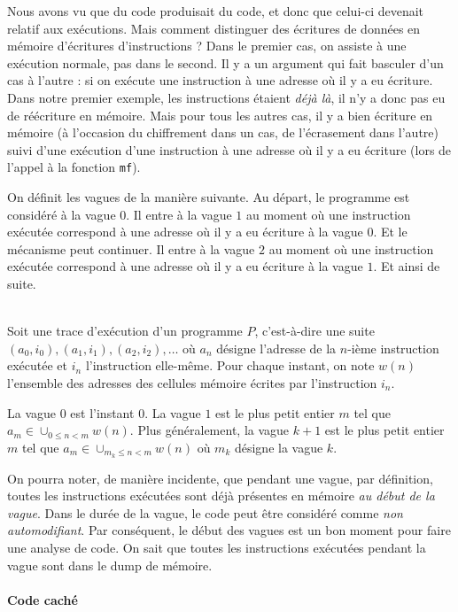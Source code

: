 \documentclass{book}
\newenvironment{formalisme}[1]{%
	\def\FrameCommand{\fboxrule=\FrameRule\fboxsep=\FrameSep \fcolorbox{red!10}{red!5}}%
	\MakeFramed {\advance\hsize-\width \FrameRestore}
	\noindent {\bf #1}\\
}%
{\endMakeFramed}
\begin{document}
Nous avons vu que du code produisait du code, et donc que celui-ci devenait relatif aux exécutions. Mais comment distinguer des écritures de données en mémoire  d'écritures d'instructions ? Dans le premier cas, on assiste à une exécution normale, pas dans le second. Il y a un argument qui fait basculer d'un cas à l'autre : si on exécute une instruction à une adresse où il y a eu écriture. Dans notre premier exemple, les instructions étaient {\em déjà là}, il n'y a donc pas eu de réécriture en mémoire. Mais pour tous les autres cas, il y a bien écriture en mémoire (à l'occasion du chiffrement dans un cas, de l'écrasement dans l'autre) suivi d'une exécution d'une instruction à une adresse où il y a eu écriture (lors de l'appel à la fonction {\tt mf}).

On définit les vagues de la manière suivante. Au départ, le programme est considéré à la vague $0$. Il entre à la vague $1$ au moment où une instruction exécutée correspond à une adresse où il y a eu écriture à la vague $0$. Et le mécanisme peut continuer. Il entre à la vague $2$ au moment où une instruction exécutée correspond à une adresse où il y a eu écriture à la vague $1$. Et ainsi de suite. 

\begin{formalisme}{Vague}
Soit une trace d'exécution d'un programme $P$, c'est-à-dire une suite $(a_0, i_0), (a_1, i_1), (a_2,i_2), \ldots$ où $a_n$ désigne l'adresse de la $n$-ième instruction exécutée et $i_n$ l'instruction elle-même. Pour chaque instant, on note $w(n)$ l'ensemble des adresses des cellules mémoire écrites par l'instruction $i_n$. 

 La vague $0$ est l'instant $0$.  La vague $1$ est le plus petit entier $m$ tel que $a_m \in \cup_{0 \leq n < m} w(n)$. Plus généralement, la vague $k+1$ est le plus petit entier $m$ tel que $a_m \in \cup_{  m_k \leq n < m} w(n)$ où $m_k$ désigne la vague $k$. 
\end{formalisme}

On pourra noter, de manière incidente, que pendant une vague, par définition, toutes les instructions exécutées sont déjà présentes en mémoire {\em au début de la vague}. Dans le durée de la vague, le code peut être considéré comme {\em non automodifiant}. Par conséquent, le début des vagues est un bon moment pour faire une analyse de code. On sait que toutes les instructions exécutées pendant la vague sont dans le dump de mémoire.

\paragraph{Code caché}
\end{document}
